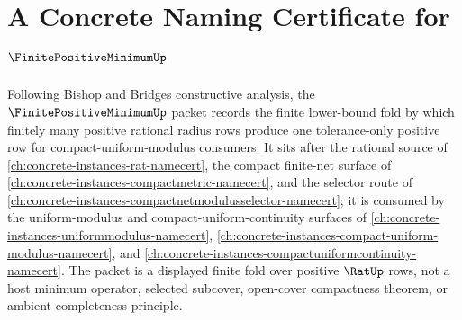 \chapter{A Concrete Naming Certificate for $\FinitePositiveMinimumUp$}
\label{ch:concrete-instances-finite-positive-minimum-namecert}

Following Bishop and Bridges constructive analysis, the $\FinitePositiveMinimumUp$ packet records the finite lower-bound fold by which finitely many positive rational radius rows produce one tolerance-only positive row for compact-uniform-modulus consumers. It sits after the rational source of \autoref{ch:concrete-instances-rat-namecert}, the compact finite-net surface of \autoref{ch:concrete-instances-compactmetric-namecert}, and the selector route of \autoref{ch:concrete-instances-compactnetmodulusselector-namecert}; it is consumed by the uniform-modulus and compact-uniform-continuity surfaces of \autoref{ch:concrete-instances-uniformmodulus-namecert}, \autoref{ch:concrete-instances-compact-uniform-modulus-namecert}, and \autoref{ch:concrete-instances-compactuniformcontinuity-namecert}. The packet is a displayed finite fold over positive $\RatUp$ rows, not a host minimum operator, selected subcover, open-cover compactness theorem, or ambient completeness principle.

